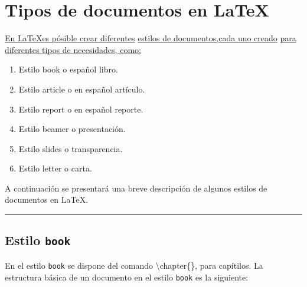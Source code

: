 \documentclass[12pt]{book}
\begin{document}
\chapter{Tipos de documentos en \LaTeX}
\begin{multicols}{2}
\underline{En \LaTeX es pósible crear diferentes}
\underline{estilos de documentos,cada uno creado}
\underline{para diferentes tipos de necesidades, }
\underline{como:}
\begin{enumerate}
    \item[\HandCuffRight] Estilo book o español libro.
    \item[\HandCuffRight] Estilo article o en español artículo.
    \item[\HandCuffRight] Estilo report o en español reporte.
    \item[\HandCuffRight] Estilo beamer o presentación.
    \item[\HandCuffRight] Estilo slides o transparencia.
    \item[\HandCuffRight] Estilo letter o carta.
\end{enumerate}
A continuación se presentará una breve descripción de algunos estilos de documentos en \LaTeX.
\end{multicols}
\vspace*{12pt}

\begin{center}
    \rule{15cm}{1pt}\par 
\end{center}


\vspace*{12pt}
\section{\bf Estilo \tt book}
En el estilo {\tt book} se dispone del comando \textbackslash chapter\{\}, para capítilos. 
La estructura básica de un documento en el estilo {\tt book} es la siguiente: 
\newpage {}
\end{document}
